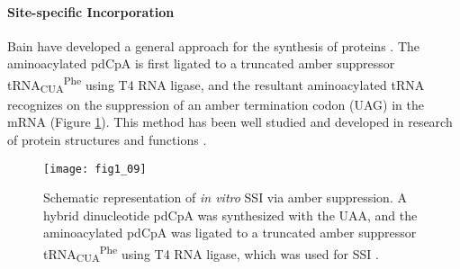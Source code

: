 \begin{refsection}
\paragraph{ Site-specific Incorporation}
Bain  have developed a general approach for the 
synthesis of proteins \cite{Bain1991}. The aminoacylated pdCpA is first ligated
to a truncated amber suppressor tRNA\textsubscript{CUA}\textsuperscript{Phe}
using T4 RNA ligase, and the resultant aminoacylated tRNA recognizes on the
suppression of an amber termination codon (UAG) in the mRNA \cite{Theato2013}
(Figure \ref{fig:ssi-intro}).  This method has been well studied and developed
in research of protein structures and functions
\cite{Martoglio1995,Eichler1997}.
\begin{figure}[htbp] \centering \texttt{[image: fig1\_09]}
    \caption[Schematic representation of \emph{in vitro} SSI via amber
        suppression. A hybrid dinucleotide pdCpA was synthesized with the UAA,
        and the aminoacylated pdCpA was ligated to a truncated amber suppressor
        tRNA\textsubscript{CUA}\textsuperscript{Phe} using T4 RNA ligase, which
        was used for SSI.]{Schematic representation of \emph{in vitro} SSI via
        amber suppression. A hybrid dinucleotide pdCpA was synthesized with the
        UAA, and the aminoacylated pdCpA was ligated to a truncated amber
        suppressor tRNA\textsubscript{CUA}\textsuperscript{Phe} using T4 RNA
        ligase, which was used for SSI \cite{Theato2013,Wang2001}.} 
    \label{fig:ssi-intro} 
\end{figure}


\end{refsection}
